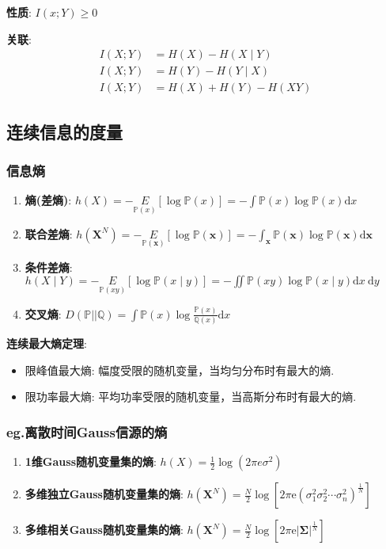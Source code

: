 \documentclass{article}
\newcommand{\env}[2]{\begin{#1}#2\end{#1}}
\begin{document}
            \textbf{性质}: $I(x ; Y) \ge 0$
            
            \textbf{关联}: 
                \env{align*}{
                    I(X ; Y) &= H(X)-H(X \mid Y) \\
                    I(X ; Y) &= H(Y)-H(Y \mid X) \\
                    I(X ; Y) &= H(X)+H(Y)-H(X Y)
                }
             
    \subsection{连续信息的度量}
        \subsubsection{信息熵}
            \env{enumerate}{
                \item \textbf{熵(差熵)}: $h(X)=-\underset{\mathbb P(x)}{E}[\log \mathbb P(x)]=-\int \mathbb P(x) \log \mathbb P(x) \mathrm{d} x$
                \item \textbf{联合差熵}: $h\left(\boldsymbol{X}^{N}\right)=-\underset{\mathbb P(\boldsymbol{x})}{E}[\log \mathbb P(\boldsymbol{x})]=-\int_{\boldsymbol{x}} \mathbb P(\boldsymbol{x}) \log \mathbb P(\boldsymbol{x}) \mathrm{d} \boldsymbol{x}$
                \item \textbf{条件差熵}: $h(X \mid Y)=-\underset{\mathbb P(x y)}{E}[\log \mathbb P(x \mid y)]=-\iint \mathbb P(x y) \log \mathbb P(x \mid y) \mathrm{d} x \mathrm{~d} y$
                \item \textbf{交叉熵}: $D(\mathbb P || \mathbb Q)=\int \mathbb P(x) \log \frac{\mathbb P(x)}{\mathbb Q(x)} \mathrm{d} x$
            }
            
            \textbf{连续最大熵定理}:
                \env{itemize}{
                    \item 限峰值最大熵: 幅度受限的随机变量，当均匀分布时有最大的熵.
                    \item 限功率最大熵: 平均功率受限的随机变量，当高斯分布时有最大的熵.
                }
            
        \subsubsection{\textbf{eg.}离散时间Gauss信源的熵}
            \env{enumerate}{
                \item \textbf{1维Gauss随机变量集的熵}: $h(X)=\frac{1}{2} \log \left(2 \pi e \sigma^{2}\right)$
                \item \textbf{多维独立Gauss随机变量集的熵}: $h\left(\boldsymbol{X}^{N}\right)=\frac{N}{2} \log \left[2 \pi \mathrm{e}\left(\sigma_{1}^{2} \sigma_{2}^{2} \cdots \sigma_{n}^{2}\right)^{\frac{1}{N}}\right]$
                \item \textbf{多维相关Gauss随机变量集的熵}: $h\left(\boldsymbol{X}^{N}\right)=\frac{N}{2} \log \left[2 \pi \mathrm{e} |\boldsymbol \Sigma|^{\frac{1}{N}}\right]$
            }
\end{document}
